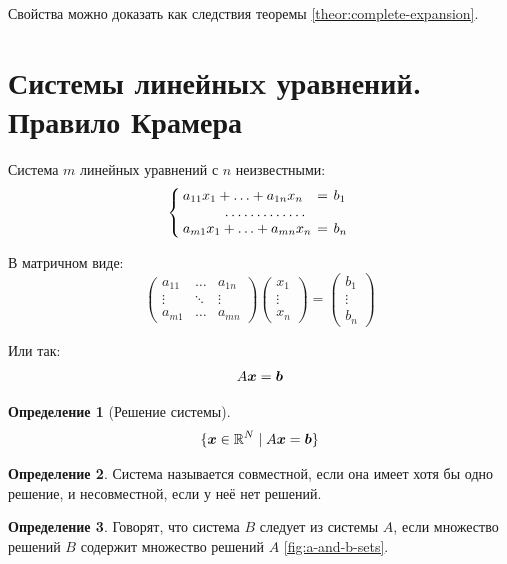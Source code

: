 \documentclass[a4paper,12pt]{article}
\theoremstyle{definition}
\newtheorem{definition}{Определение}[section]
\theoremstyle{remark}
\theoremstyle{remark}
\begin{document}
  Свойства можно доказать как следствия теоремы \ref{theor:complete-expansion}.
  

  \section{Системы линейныx уравнений. Правило Крамера}
  
  Система $m$ линейных уравнений с $n$ неизвестными:
  \[
    \renewcommand{\arraycolsep}{2pt}
    \left\{
      \begin{array}{lcl}
        a_{11} x_1 + \ldots + a_{1n} x_n & = & b_1\\
        \hdotsfor{3}\\
        a_{m1} x_1 + \ldots + a_{mn} x_n & = & b_n
      \end{array}
    \right.
  \]
  
  В матричном виде:
  \[
    \begin{pmatrix}
      a_{11} & \ldots & a_{1n}\\
      \vdots & \ddots & \vdots\\
      a_{m1} & \ldots & a_{mn}
    \end{pmatrix}
    \begin{pmatrix}
      x_1\\
      \vdots\\
      x_n
    \end{pmatrix}
    =
    \begin{pmatrix}
      b_1\\
      \vdots\\
      b_n
    \end{pmatrix}
  \]
  
  Или так:
  \[
    A \boldsymbol x = \boldsymbol b
  \]
  
  \begin{definition}[Решение системы]
    \[
      \{\boldsymbol x \in \operatorname{\mathbb R}^N \mid A \boldsymbol x = \boldsymbol b\}
    \]
  \end{definition}
  
  \begin{definition}
    Система называется совместной, если она имеет хотя бы одно решение, и несовместной, если у неё нет решений.
  \end{definition}
  
  \begin{definition}
    Говорят, что система $B$ следует из системы $A$, если множество решений $B$ содержит множество решений $A$ \ref{fig:a-and-b-sets}.
  \end{definition}
  
\end{document}
